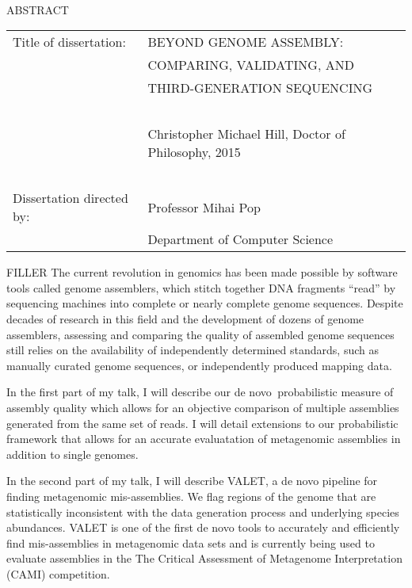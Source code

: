 
\hbox{\ }

\renewcommand{\baselinestretch}{1}
\small \normalsize

\begin{center}
\large{{ABSTRACT}} 

\vspace{3em} 

\end{center}
\hspace{-.15in}
\begin{tabular}{ll}
Title of dissertation:    & {\large  BEYOND GENOME ASSEMBLY: }\\
&				      {\large COMPARING, VALIDATING, AND } \\
&                     {\large THIRD-GENERATION SEQUENCING} \\
\ \\
&                          {\large  Christopher Michael Hill, Doctor of Philosophy, 2015} \\
\ \\
Dissertation directed by: & {\large  Professor Mihai Pop} \\
&  				{\large	 Department of Computer Science } \\
\end{tabular}

\vspace{3em}

\renewcommand{\baselinestretch}{2}
\large \normalsize

FILLER
The current revolution in genomics has been made possible by software tools called genome assemblers, which stitch together DNA fragments “read” by sequencing machines into complete or nearly complete genome sequences. Despite decades of research in this field and the development of dozens of genome assemblers, assessing and comparing the quality of assembled genome sequences still relies on the availability of independently determined standards, such as manually curated genome sequences, or independently produced mapping data.

In the first part of my talk, I will describe our de novo  probabilistic measure of assembly quality which allows for an objective comparison of multiple assemblies generated from the same set of reads. I will detail extensions to our probabilistic framework that allows for an accurate evaluatation of metagenomic assemblies in addition to single genomes.

In the second part of my talk, I will describe VALET, a de novo pipeline for finding metagenomic mis-assemblies.  We flag regions of the genome that are statistically inconsistent with the data generation process and underlying species abundances. VALET is one of the first de novo tools to accurately and efficiently find mis-assemblies in metagenomic data sets and is currently being used to evaluate assemblies in the The Critical Assessment of Metagenome Interpretation (CAMI) competition.

